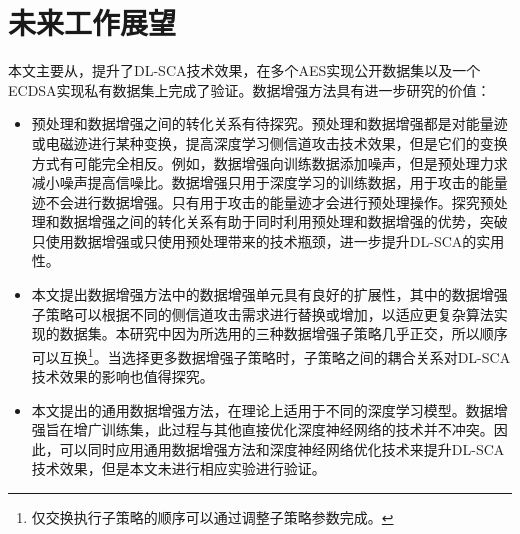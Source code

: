 {	\section{未来工作展望}
	本文主要从\jiaodu，提升了DL-SCA技术效果，在多个AES实现公开数据集以及一个ECDSA实现私有数据集上完成了验证。数据增强方法具有进一步研究的价值：
	\begin{itemize}
		\item 预处理和数据增强之间的转化关系有待探究。预处理和数据增强都是对能量迹或电磁迹进行某种变换，提高深度学习侧信道攻击技术效果，但是它们的变换方式有可能完全相反。例如，数据增强向训练数据添加噪声，但是预处理力求减小噪声提高信噪比。数据增强只用于深度学习的训练数据，用于攻击的能量迹不会进行数据增强。只有用于攻击的能量迹才会进行预处理操作。探究预处理和数据增强之间的转化关系有助于同时利用预处理和数据增强的优势，突破只使用数据增强或只使用预处理带来的技术瓶颈，进一步提升DL-SCA的实用性。
		\item 本文提出数据增强方法中的数据增强单元具有良好的扩展性，其中的数据增强子策略可以根据不同的侧信道攻击需求进行替换或增加，以适应更复杂算法实现的数据集。本研究中因为所选用的三种数据增强子策略几乎正交，所以顺序可以互换\footnote{仅交换执行子策略的顺序可以通过调整子策略参数完成。}。当选择更多数据增强子策略时，子策略之间的耦合关系对DL-SCA技术效果的影响也值得探究。
		\item 本文提出的通用数据增强方法，在理论上适用于不同的深度学习模型。数据增强旨在增广训练集，此过程与其他直接优化深度神经网络的技术并不冲突。因此，可以同时应用通用数据增强方法和深度神经网络优化技术来提升DL-SCA技术效果，但是本文未进行相应实验进行验证。
	\end{itemize}
}